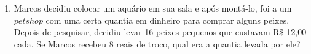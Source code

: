 \documentclass[a4paper,14pt]{article}
\begin{document}
\begin{multicols}{2}
\begin{enumerate}
	        \item Marcos decidiu colocar um aquário em sua sala e após montá-lo, foi a um $pet shop$ com uma certa quantia em dinheiro para comprar alguns peixes. Depois de pesquisar, decidiu levar 16 peixes pequenos que custavam R\$ 12,00 cada. Se Marcos recebeu 8 reais de troco, qual era a quantia levada por ele? \\\\\\\\\\\\\\\\\\
	    \end{enumerate} 
        $~$ \\ $~$ \\ $~$ \\ $~$ \\ $~$ \\ $~$ \\ $~$ \\ $~$ \\ $~$ \\ $~$ \\ $~$ \\ $~$ \\ $~$  \\ $~$ \\ $~$ \\ $~$ \\ $~$ \\ $~$ \\ $~$ \\ $~$ \\ $~$ \\ $~$ \\ $~$ \\ $~$ \\ $~$ \\ $~$ \\ $~$ \\ $~$ \\ $~$ \\ $~$ \\ $~$ \\ $~$ \\ $~$ \\ $~$ \\ $~$ \\ $~$ \\ $~$ \\ $~$ \\ $~$ \\ $~$ \\ $~$ \\ $~$ \\ $~$ \\ $~$ \\ $~$ \\ $~$ \\ $~$ \\ $~$ \\ $~$ \\ $~$ \\ $~$ \\
	\end{multicols}
\end{document}
